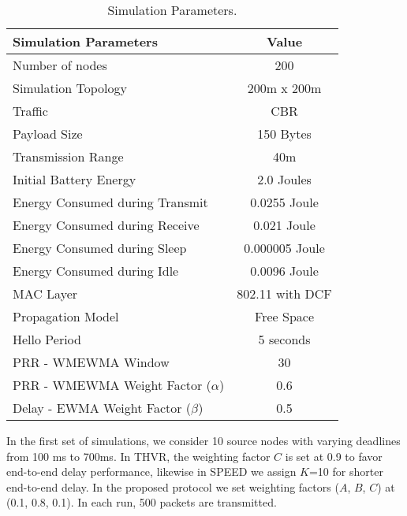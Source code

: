 \documentclass[fleqn,twoside]{article}
\begin{document}
\begin{table}[ht]
\centering
\caption{Simulation Parameters.}
\begin{tiny}
\begin{center}
\begin{tabular}{|l|c| } \hline
{\bf Simulation Parameters} & {\bf  Value} \\ \hline
{Number of nodes} 		&{200} \\ \hline
{Simulation Topology} 		&{200m x 200m} \\ \hline
{Traffic} 			&{CBR} \\ \hline
{Payload Size} 			&{150 Bytes} \\ \hline
{Transmission Range}			&{40m} \\ \hline
{Initial Battery Energy }		&{2.0 Joules} \\ \hline
{Energy Consumed during Transmit }	&{0.0255 Joule} \\ \hline
{Energy Consumed during Receive }	&{0.021 Joule} \\ \hline
{Energy Consumed during Sleep }		&{0.000005 Joule} \\ \hline
{Energy Consumed during Idle }		&{0.0096 Joule} \\ \hline
{MAC Layer}			&{802.11 with DCF} \\ \hline
{Propagation Model}		&{Free Space} \\ \hline
{Hello Period} 			&{5 seconds} \\ \hline
{PRR - WMEWMA Window} 			&{30} \\ \hline
{PRR - WMEWMA Weight Factor ($\alpha$)}	&{0.6} \\ \hline
{Delay - EWMA Weight Factor ($\beta$)}	&{0.5} \\ \hline
\end{tabular}
\end{center}
\end{tiny}
\end{table}

In the first set of simulations, we consider 10 source nodes with varying deadlines from 100 ms to 700ms. In THVR, the weighting factor $C$ is set at 0.9 to favor end-to-end delay performance, likewise in SPEED we assign $K$=10 for shorter end-to-end delay. In the proposed protocol we set weighting factors ($A$, $B$, $C$) at (0.1, 0.8, 0.1). In each run, 500 packets are transmitted. 
\end{document}
